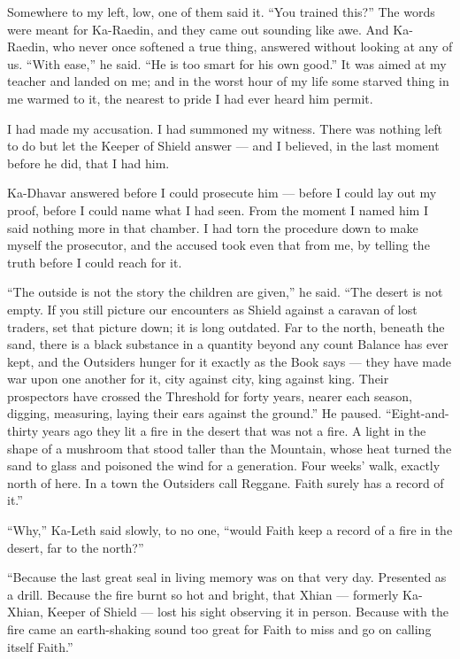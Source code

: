 Somewhere to my left, low, one of them said it. ``You trained this?'' The words were meant for Ka-Raedin, and they came out sounding like awe. And Ka-Raedin, who never once softened a true thing, answered without looking at any of us. ``With ease,'' he said. ``He is too smart for his own good.'' It was aimed at my teacher and landed on me; and in the worst hour of my life some starved thing in me warmed to it, the nearest to pride I had ever heard him permit.\par

I had made my accusation. I had summoned my witness. There was nothing left to do but let the Keeper of Shield answer --- and I believed, in the last moment before he did, that I had him.\par
 
\ornament
 
Ka-Dhavar answered before I could prosecute him ---
before I could lay out my proof, before I could name what I had seen. From the moment I named him I said nothing more in that chamber. I had torn the procedure down to make myself the prosecutor, and the accused took even that from me, by telling the truth before I could reach for it.\par

``The outside is not the story the children are given,'' he said. ``The desert is not empty.
If you still picture our encounters as Shield against a caravan of lost traders, set that picture down; it is long outdated.
Far to the north, beneath the sand, there is a black substance in a quantity beyond any count Balance has ever kept, and the Outsiders hunger for
it exactly as the Book says --- they have made war upon one another for it, city against city, king against king.
Their prospectors have crossed the Threshold for forty years, nearer each season, digging, measuring, laying their ears against the ground.''
He paused. ``Eight-and-thirty years ago they lit a fire in the desert that was not a fire. A light in the shape of a mushroom
that stood taller than the Mountain, whose heat turned the sand to glass and poisoned the wind for a generation. Four weeks' walk, exactly north of here. 
In a town the Outsiders call Reggane. Faith surely has a record of it.'' 

``Why,'' Ka-Leth said slowly, to no one, ``would Faith keep a record of a fire in the desert, far to the north?''\par
 
``Because the last great seal in living memory was on that very day. 
Presented as a drill. 
Because the fire burnt so hot and bright, that Xhian --- formerly Ka-Xhian, Keeper of Shield --- lost his sight observing it in person.
Because with the fire came an earth-shaking sound too great for Faith to miss and go on calling itself Faith.''

